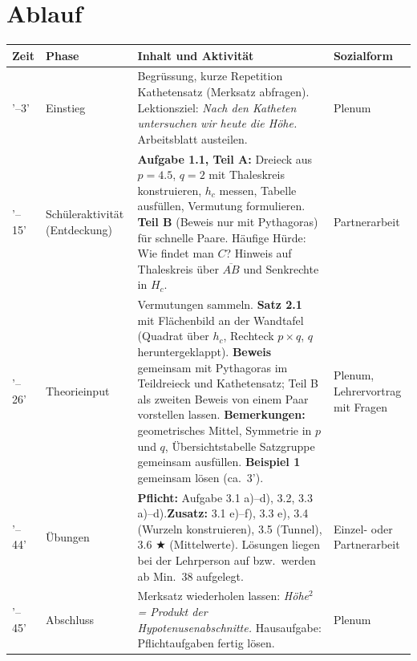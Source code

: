 \documentclass[11pt,oneside]{article}
\begin{document}
\section*{Ablauf}
\renewcommand{\arraystretch}{1.3}
\begin{tabularx}{\textwidth}{|>{\raggedright\arraybackslash}p{11mm}|>{\raggedright\arraybackslash}p{27mm}|X|>{\raggedright\arraybackslash}p{22mm}|}\hline
	\textbf{Zeit} & \textbf{Phase} & \textbf{Inhalt und Aktivität} & \textbf{Sozialform}\\\hline
	0'--3' & Einstieg & Begrüssung, kurze Repetition Kathetensatz (Merksatz abfragen). Lektionsziel: \textit{Nach den Katheten untersuchen wir heute die Höhe.} Arbeitsblatt austeilen. & Plenum\\\hline
	3'--15' & Schüleraktivität (Entdeckung) & \textbf{Aufgabe 1.1, Teil A:} Dreieck aus $p=4.5$, $q=2$ mit Thaleskreis konstruieren, $h_c$ messen, Tabelle ausfüllen, Vermutung formulieren. \textbf{Teil B} (Beweis nur mit Pythagoras) für schnelle Paare. Häufige Hürde: Wie findet man $C$? Hinweis auf Thaleskreis über $\overline{AB}$ und Senkrechte in $H_c$. & Partnerarbeit\\\hline
	15'--26' & Theorieinput & Vermutungen sammeln. \textbf{Satz 2.1} mit Flächenbild an der Wandtafel (Quadrat über $h_c$, Rechteck $p\times q$, $q$ heruntergeklappt). \textbf{Beweis} gemeinsam mit Pythagoras im Teildreieck und Kathetensatz; Teil B als zweiten Beweis von einem Paar vorstellen lassen. \textbf{Bemerkungen:} geometrisches Mittel, Symmetrie in $p$ und $q$, Übersichtstabelle Satzgruppe gemeinsam ausfüllen. \textbf{Beispiel 1} gemeinsam lösen (ca.\ 3'). & Plenum, Lehrervortrag mit Fragen\\\hline
	26'--44' & Übungen & \textbf{Pflicht:} Aufgabe 3.1 a)--d), 3.2, 3.3 a)--d).\newline \textbf{Zusatz:} 3.1 e)--f), 3.3 e), 3.4 (Wurzeln konstruieren), 3.5 (Tunnel), 3.6 $\bigstar$ (Mittelwerte). Lösungen liegen bei der Lehrperson auf bzw.\ werden ab Min.\ 38 aufgelegt. & Einzel- oder Partnerarbeit\\\hline
	44'--45' & Abschluss & Merksatz wiederholen lassen: \textit{Höhe$^2$ = Produkt der Hypotenusenabschnitte.} Hausaufgabe: Pflichtaufgaben fertig lösen. & Plenum\\\hline
\end{tabularx}
\end{document}
